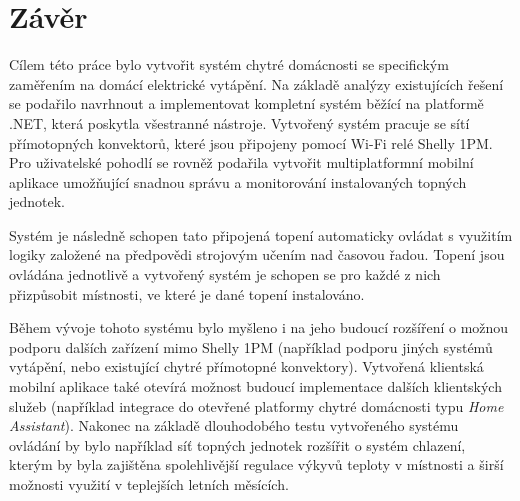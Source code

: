 \chapter{Závěr}
\label{zaver}
Cílem této práce bylo vytvořit systém chytré domácnosti se specifickým zaměřením na domácí elektrické vytápění. Na základě analýzy existujících řešení se podařilo navrhnout a implementovat kompletní systém běžící na platformě .NET, která poskytla všestranné nástroje. Vytvořený systém pracuje se sítí přímotopných konvektorů, které jsou připojeny pomocí Wi-Fi relé Shelly 1PM. Pro uživatelské pohodlí se rovněž podařila vytvořit multiplatformní mobilní aplikace umožňující snadnou správu a monitorování instalovaných topných jednotek.

Systém je následně schopen tato připojená topení automaticky ovládat s využitím logiky založené na předpovědi strojovým učením nad časovou řadou. Topení jsou ovládána jednotlivě a vytvořený systém je schopen se pro každé z nich přizpůsobit místnosti, ve které je dané topení instalováno.

Během vývoje tohoto systému bylo myšleno i na jeho budoucí rozšíření o možnou podporu dalších zařízení mimo Shelly 1PM (například podporu jiných systémů vytápění, nebo existující chytré přímotopné konvektory). Vytvořená klientská mobilní aplikace také otevírá možnost budoucí implementace dalších klientských služeb (například integrace do otevřené platformy chytré domácnosti typu {\it Home Assistant}). Nakonec na základě dlouhodobého testu vytvořeného systému ovládání by bylo například síť topných jednotek rozšířit o systém chlazení, kterým by byla zajištěna spolehlivější regulace výkyvů teploty v místnosti a širší možnosti využití v teplejších letních měsících.

